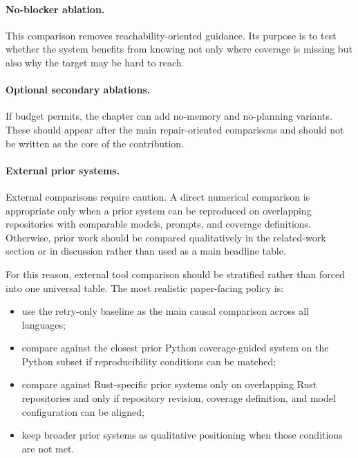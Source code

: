 \documentclass[10pt]{article}
\begin{document}
\paragraph{No-blocker ablation.}
This comparison removes reachability-oriented guidance. Its purpose is to test whether the system benefits from knowing not only where coverage is missing but also why the target may be hard to reach.

\paragraph{Optional secondary ablations.}
If budget permits, the chapter can add no-memory and no-planning variants. These should appear after the main repair-oriented comparisons and should not be written as the core of the contribution.

\paragraph{External prior systems.}
External comparisons require caution. A direct numerical comparison is appropriate only when a prior system can be reproduced on overlapping repositories with comparable models, prompts, and coverage definitions. Otherwise, prior work should be compared qualitatively in the related-work section or in discussion rather than used as a main headline table.

For this reason, external tool comparison should be stratified rather than forced into one universal table. The most realistic paper-facing policy is:
\begin{itemize}[leftmargin=1.4em]
    \item use the retry-only baseline as the main causal comparison across all languages;
    \item compare against the closest prior Python coverage-guided system on the Python subset if reproducibility conditions can be matched;
    \item compare against Rust-specific prior systems only on overlapping Rust repositories and only if repository revision, coverage definition, and model configuration can be aligned;
    \item keep broader prior systems as qualitative positioning when those conditions are not met.
\end{itemize}
\end{document}
